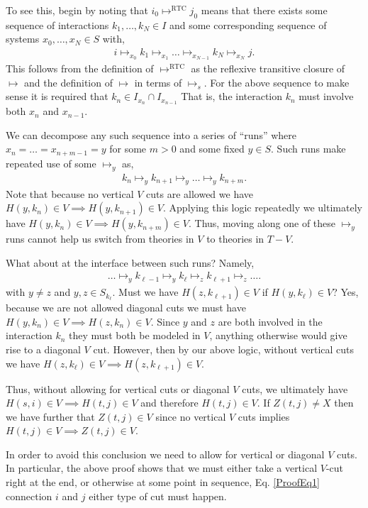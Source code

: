 \documentclass[12pt,prd,superscriptaddress,floatfix,amsmath,amssymb,amsfonts,nofootinbib]{revtex4-2}
\begin{document}
To see this, begin by noting that $i_0\mapsto^\text{RTC}j_0$ means that there exists some sequence of interactions $k_1,\dots,k_N\in I$ and some corresponding sequence of systems $x_0,\dots,x_N\in S$ with, 
\begin{align}\label{ProofEq1}
i\mapsto_{x_0}k_1\mapsto_{x_1}\dots\mapsto_{x_{N-1}}k_N\mapsto_{x_N} j.    
\end{align}
This follows from the definition of $\mapsto^\text{RTC}$ as the reflexive transitive closure of $\mapsto$ and the definition of $\mapsto$ in terms of $\mapsto_s$. For the above sequence to make sense it is required that $k_n\in I_{x_n}\cap I_{x_{n-1}}$ That is, the interaction $k_n$ must involve both $x_n$ and $x_{n-1}$. 

We can decompose any such sequence into a series of ``runs'' where $x_n=\dots=x_{n+m-1}=y$ for some $m>0$ and some fixed $y\in S$. Such runs make repeated use of some $\mapsto_{y}$ as,
\begin{align}
k_n\mapsto_{y}k_{n+1} \mapsto_{y}\dots\mapsto_{y}k_{n+m}. 
\end{align}
Note that because no vertical $V$ cuts are allowed we have \mbox{$H(y,k_n)\in V\implies H(y,k_{n+1})\in V$}. Applying this logic repeatedly we ultimately have \mbox{$H(y,k_n)\in V\implies H(y,k_{n+m})\in V$}. Thus, moving along one of these $\mapsto_{y}$ runs cannot help us switch from theories in $V$ to theories in $T-V$.

What about at the interface between such runs? Namely, 
\begin{align}
\dots\mapsto_{y}k_{\ell-1}\mapsto_{y}k_\ell \mapsto_{z}k_{\ell+1}\mapsto_{z}\dots. 
\end{align}
with $y\neq z$ and  $y,z\in S_{k_\ell}$. Must we have \mbox{$H(z,k_{\ell+1})\in V$} if \mbox{$H(y,k_\ell)\in V$}? Yes, because we are not allowed diagonal cuts we must have \mbox{$H(y,k_n)\in V\implies H(z,k_n)\in V$}. Since $y$ and $z$ are both involved in the interaction $k_n$ they must both be modeled in $V$, anything otherwise would give rise to a diagonal $V$ cut. However, then by our above logic, without vertical cuts we have \mbox{$H(z,k_\ell)\in V \implies H(z,k_{\ell+1})\in V$}.

Thus, without allowing for vertical cuts or diagonal $V$ cuts, we ultimately have \mbox{$H(s,i)\in V \implies H(t,j)\in V$} and therefore $H(t,j)\in V$. If $Z(t,j)\neq X$ then we have further that $Z(t,j)\in V$ since no vertical $V$ cuts implies \mbox{$H(t,j)\in V \implies Z(t,j)\in V$}.

In order to avoid this conclusion we need to allow for vertical or diagonal $V$ cuts. In particular, the above proof shows that we must either take a vertical $V$-cut right at the end, or otherwise at some point in sequence, Eq. \eqref{ProofEq1} connection $i$ and $j$ either type of cut must happen.
\end{document}
